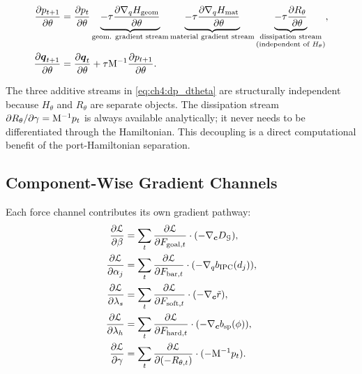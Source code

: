 \begin{align}
  \frac{\partial p_{t+1}}{\partial\theta}
  &= \frac{\partial p_t}{\partial\theta}
  \underbrace{-\tau\frac{\partial\nabla_q H_{\mathrm{geom}}}{\partial\theta}
  }_{\text{geom. gradient stream}}
  \underbrace{-\tau\frac{\partial\nabla_q H_{\mathrm{mat}}}{\partial\theta}
  }_{\text{material gradient stream}}
  \underbrace{-\tau\frac{\partial R_\theta}{\partial\theta}
  }_{\substack{\text{dissipation stream}\\\text{(independent of }H_\theta\text{)}}},
  \label{eq:ch4:dp_dtheta} \\
  \frac{\partial\boldsymbol{q}_{t+1}}{\partial\theta}
  &= \frac{\partial\boldsymbol{q}_t}{\partial\theta}
  + \tau\mathrm{M}^{-1}\frac{\partial p_{t+1}}{\partial\theta}.
  \label{eq:ch4:dq_dtheta}
\end{align}

The three additive streams in \eqref{eq:ch4:dp_dtheta} are structurally
independent because $H_\theta$ and $R_\theta$ are separate objects.
The dissipation stream $\partial R_\theta/\partial\gamma =
\mathrm{M}^{-1}p_t$ is always available analytically; it never needs
to be differentiated through the Hamiltonian.
This decoupling is a direct computational benefit of the
port-Hamiltonian separation.

\subsection{Component-Wise Gradient Channels}
\label{subsec:ch4:grad_channels}

Each force channel contributes its own gradient pathway:
\begin{align}
  \frac{\partial\mathcal{L}}{\partial\beta}
  &= \sum_t\frac{\partial\mathcal{L}}{\partial F_{\mathrm{goal},t}}
     \cdot(-\nabla_{\boldsymbol{c}}D_\mathcal{G}),
  \label{eq:ch4:dL_dbeta} \\
  \frac{\partial\mathcal{L}}{\partial\alpha_j}
  &= \sum_t\frac{\partial\mathcal{L}}{\partial F_{\mathrm{bar},t}}
     \cdot(-\nabla_q b_{\mathrm{IPC}}(d_j)),
  \label{eq:ch4:dL_dalpha} \\
  \frac{\partial\mathcal{L}}{\partial\lambda_s}
  &= \sum_t\frac{\partial\mathcal{L}}{\partial F_{\mathrm{soft},t}}
     \cdot(-\nabla_{\boldsymbol{c}}\tilde{r}),
  \label{eq:ch4:dL_dlambda_s} \\
  \frac{\partial\mathcal{L}}{\partial\lambda_h}
  &= \sum_t\frac{\partial\mathcal{L}}{\partial F_{\mathrm{hard},t}}
     \cdot(-\nabla_{\boldsymbol{c}}b_{\mathrm{sp}}(\phi)),
  \label{eq:ch4:dL_dlambda_h} \\
  \frac{\partial\mathcal{L}}{\partial\gamma}
  &= \sum_t\frac{\partial\mathcal{L}}{\partial(-R_{\theta,t})}
     \cdot(-\mathrm{M}^{-1}p_t).
  \label{eq:ch4:dL_dgamma}
\end{align}

